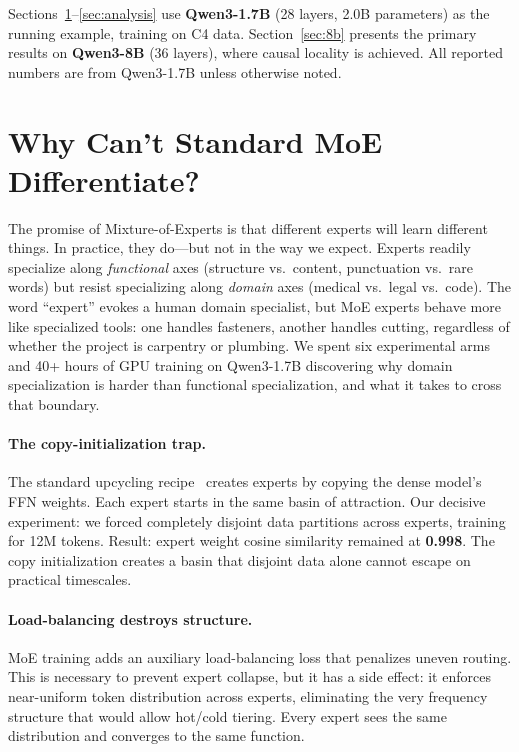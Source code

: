 \documentclass{article}
\begin{document}
Sections~\ref{sec:why-moe-fails}--\ref{sec:analysis} use \textbf{Qwen3-1.7B}
(28 layers, 2.0B parameters) as the running example, training on C4 data.
Section~\ref{sec:8b} presents the primary results on \textbf{Qwen3-8B} (36
layers), where causal locality is achieved. All reported numbers are from
Qwen3-1.7B unless otherwise noted.

\section{Why Can't Standard MoE Differentiate?}
\label{sec:why-moe-fails}

The promise of Mixture-of-Experts is that different experts will learn different
things. In practice, they do---but not in the way we expect. Experts readily
specialize along \emph{functional} axes (structure vs.\ content, punctuation
vs.\ rare words) but resist specializing along \emph{domain} axes (medical
vs.\ legal vs.\ code). The word ``expert'' evokes a human domain specialist,
but MoE experts behave more like specialized tools: one handles
fasteners, another handles cutting, regardless of whether the project is
carpentry or plumbing. We spent six experimental arms and 40+ hours of GPU
training on Qwen3-1.7B discovering why domain specialization is harder than
functional specialization, and what it takes to cross that boundary.

\paragraph{The copy-initialization trap.}
The standard upcycling recipe~\cite{komatsuzaki2023sparse} creates experts by
copying the dense model's FFN weights. Each expert starts in the same basin of
attraction. Our decisive experiment: we forced completely disjoint data
partitions across experts, training for 12M tokens. Result: expert weight cosine
similarity remained at \textbf{0.998}. The copy initialization creates a basin
that disjoint data alone cannot escape on practical timescales.

\paragraph{Load-balancing destroys structure.}
MoE training adds an auxiliary load-balancing loss that penalizes uneven routing.
This is necessary to prevent expert collapse, but it has a side effect: it
enforces near-uniform token distribution across experts, eliminating the very
frequency structure that would allow hot/cold tiering. Every expert sees the
same distribution and converges to the same function.
\end{document}
